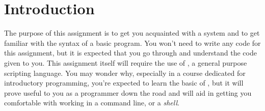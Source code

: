 \section{Introduction}

\noindent The purpose of this assignment is to get you acquainted with a \Unix
system and to get familiar with the syntax of a basic \C program. You won't need
to write any \C code for this assignment, but it is expected that you go through
and understand the code given to you. This assignment itself will require the
use of \Bash, a general purpose scripting language. You may wonder why,
especially in a course dedicated for introductory \C programming, you're
expected to learn the basic of \Bash, but it will prove useful to you as a
programmer down the road and will aid in getting you comfortable with working in
a \Unix command line, or a \emph{shell}.
